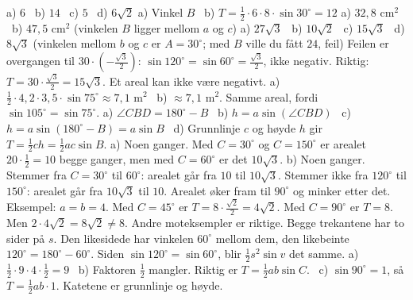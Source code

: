 
 a) $6$ \ b) $14$ \ c) $5$ \ d) $6\sqrt2$
 a) Vinkel $B$ \ b) $T = \frac12 \cdot 6 \cdot 8 \cdot \sin 30^\circ = 12$
 a) $32{,}8$ cm$^2$ \ b) $47{,}5$ cm$^2$ (vinkelen $B$ ligger mellom $a$ og $c$)
 a) $27\sqrt3$ \ b) $10\sqrt2$ \ c) $15\sqrt3$ \ d) $8\sqrt3$ (vinkelen mellom $b$ og $c$ er $A = 30^\circ$; med $B$ ville du fått $24$, feil)
 Feilen er overgangen til $30\cdot(-\frac{\sqrt3}{2})$: $\sin 120^\circ = \sin 60^\circ = \frac{\sqrt3}{2}$, ikke negativ. Riktig: $T = 30 \cdot \frac{\sqrt3}{2} = 15\sqrt3$. Et areal kan ikke være negativt.
 a) $\frac12 \cdot 4{,}2 \cdot 3{,}5 \cdot \sin 75^\circ \approx 7{,}1$ m$^2$ \ b) $\approx 7{,}1$ m$^2$. Samme areal, fordi $\sin 105^\circ = \sin 75^\circ$.
 a) $\angle CBD = 180^\circ - B$ \ b) $h = a\sin(\angle CBD)$ \ c) $h = a\sin(180^\circ - B) = a\sin B$ \ d) Grunnlinje $c$ og høyde $h$ gir $T = \frac12 c h = \frac12 ac\sin B$.
 a) Noen ganger. Med $C = 30^\circ$ og $C = 150^\circ$ er arealet $20 \cdot \frac12 = 10$ begge ganger, men med $C = 60^\circ$ er det $10\sqrt3$.
b) Noen ganger. Stemmer fra $C = 30^\circ$ til $60^\circ$: arealet går fra $10$ til $10\sqrt3$. Stemmer ikke fra $120^\circ$ til $150^\circ$: arealet går fra $10\sqrt3$ til $10$. Arealet øker fram til $90^\circ$ og minker etter det.
 Eksempel: $a = b = 4$. Med $C = 45^\circ$ er $T = 8 \cdot \frac{\sqrt2}{2} = 4\sqrt2$. Med $C = 90^\circ$ er $T = 8$. Men $2 \cdot 4\sqrt2 = 8\sqrt2 \neq 8$. Andre moteksempler er riktige.
 Begge trekantene har to sider på $s$. Den likesidede har vinkelen $60^\circ$ mellom dem, den likebeinte $120^\circ = 180^\circ - 60^\circ$. Siden $\sin 120^\circ = \sin 60^\circ$, blir $\frac12 s^2\sin v$ det samme.
 a) $\frac12 \cdot 9 \cdot 4 \cdot \frac12 = 9$ \ b) Faktoren $\frac12$ mangler. Riktig er $T = \frac12 ab\sin C$. \ c) $\sin 90^\circ = 1$, så $T = \frac12 ab \cdot 1$. Katetene er grunnlinje og høyde.

